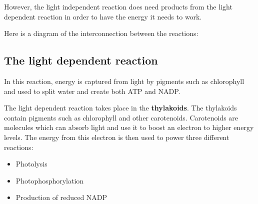 \documentclass{article}
\begin{document}
However, the light independent reaction does need products from the light
dependent reaction in order to have the energy it needs to work.

Here is a diagram of the interconnection between the reactions:

\begin{center}
\end{center}

\subsection*{The light dependent reaction}
In this reaction, energy is captured from light by pigments such as chlorophyll
and used to split water and create both ATP and NADP.

The light dependent reaction takes place in the \textbf{thylakoids}. The
thylakoids contain pigments such as chlorophyll and other carotenoids.
Carotenoids are molecules which can absorb light and use it to boost an electron
to higher energy levels. The energy from this electron is then used to power
three different reactions:
\begin {itemize}
 \item Photolysis
 \item Photophosphorylation
 \item Production of reduced NADP
\end{itemize}

\newpage
\end{document}
